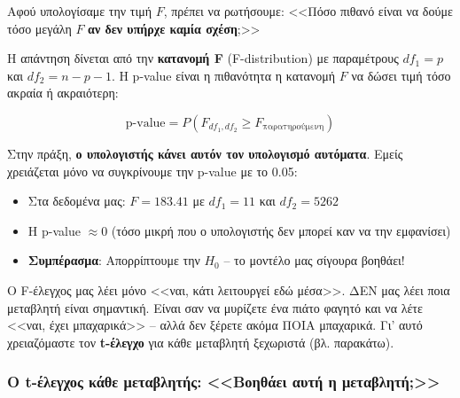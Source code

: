 \documentclass[12pt,a4paper]{article}
\begin{document}
\begin{theorybox}
Αφού υπολογίσαμε την τιμή $F$, πρέπει να ρωτήσουμε: <<Πόσο πιθανό είναι να δούμε τόσο μεγάλη $F$ \textbf{αν δεν υπήρχε καμία σχέση};>>

Η απάντηση δίνεται από την \textbf{κατανομή F} (F-distribution) με παραμέτρους $df_1 = p$ και $df_2 = n - p - 1$. Η p-value είναι η πιθανότητα η κατανομή $F$ να δώσει τιμή τόσο ακραία ή ακραιότερη:

$$\text{p-value} = P(F_{df_1, df_2} \geq F_{\text{παρατηρούμενη}})$$

Στην πράξη, \textbf{ο υπολογιστής κάνει αυτόν τον υπολογισμό αυτόματα}. Εμείς χρειάζεται μόνο να συγκρίνουμε την p-value με το 0.05:
\begin{itemize}
    \item Στα δεδομένα μας: $F = 183.41$ με $df_1 = 11$ και $df_2 = 5262$
    \item Η p-value $\approx 0$ (τόσο μικρή που ο υπολογιστής δεν μπορεί καν να την εμφανίσει)
    \item \textbf{Συμπέρασμα}: Απορρίπτουμε την $H_0$ -- το μοντέλο μας σίγουρα βοηθάει!
\end{itemize}
\end{theorybox}

\begin{warningbox}
Ο F-έλεγχος μας λέει μόνο <<ναι, κάτι λειτουργεί εδώ μέσα>>. ΔΕΝ μας λέει ποια μεταβλητή είναι σημαντική. Είναι σαν να μυρίζετε ένα πιάτο φαγητό και να λέτε <<ναι, έχει μπαχαρικά>> -- αλλά δεν ξέρετε ακόμα ΠΟΙΑ μπαχαρικά. Γι' αυτό χρειαζόμαστε τον \textbf{t-έλεγχο} για κάθε μεταβλητή ξεχωριστά (βλ. παρακάτω).
\end{warningbox}

\subsubsection{Ο t-έλεγχος κάθε μεταβλητής: <<Βοηθάει αυτή η μεταβλητή;>>}
\end{document}
